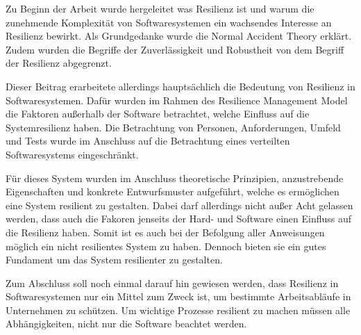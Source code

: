 \documentclass[]{lni}
\begin{document}
Zu Beginn der Arbeit wurde hergeleitet was Resilienz ist und warum die zunehmende Komplexität von Softwaresystemen ein wachsendes Interesse an Resilienz bewirkt.
Als Grundgedanke wurde die Normal Accident Theory erklärt.
Zudem wurden die Begriffe der Zuverlässigkeit und Robustheit von dem Begriff der Resilienz abgegrenzt.

Dieser Beitrag erarbeitete allerdings hauptsächlich die Bedeutung von Resilienz in Softwaresystemen.
Dafür wurden im Rahmen des Resilience Management Model die Faktoren außerhalb der Software betrachtet, welche Einfluss auf die Systemresilienz haben.
Die Betrachtung von Personen, Anforderungen, Umfeld und Tests wurde im Anschluss auf die Betrachtung eines verteilten Softwaresystems eingeschränkt.

Für dieses System wurden im Anschluss theoretische Prinzipien, anzustrebende Eigenschaften und konkrete Entwurfsmuster aufgeführt, welche es ermöglichen eine System resilient zu gestalten.
Dabei darf allerdings nicht außer Acht gelassen werden, dass auch die Fakoren jenseits der Hard- und Software einen Einfluss auf die Resilienz haben.
Somit ist es auch bei der Befolgung aller Anweisungen möglich ein nicht resilientes System zu haben.
Dennoch bieten sie ein gutes Fundament um das System resilienter zu gestalten.

Zum Abschluss soll noch einmal darauf hin gewiesen werden, dass Resilienz in Softwaresystemen nur ein Mittel zum Zweck ist, um bestimmte Arbeitsabläufe in Unternehmen zu schützen.
Um wichtige Prozesse resilient zu machen müssen alle Abhängigkeiten, nicht nur die Software beachtet werden.

\break

\printbibliography
\end{document}
